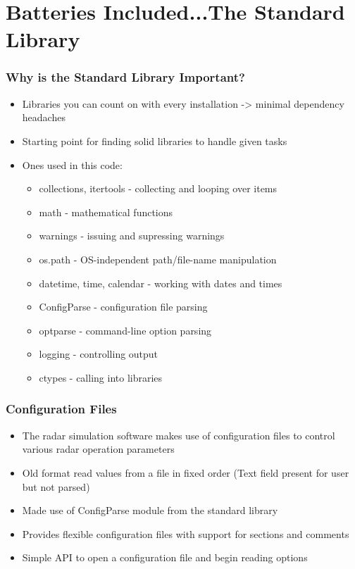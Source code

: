 \documentclass[red, hyperref={pdfpagelabels=false}]{beamer}
\begin{document}
\section[The Standard Library]{Batteries Included...The Standard Library}
\begin{frame}
  \frametitle{Why is the Standard Library Important?}
  \begin{itemize}
    \item<1-> Libraries you can count on with every installation -> minimal dependency headaches
    \item<2-> Starting point for finding solid libraries to handle given tasks
    \item<3-> Ones used in this code:
      \begin{itemize}
        \item collections, itertools - collecting and looping over items
        \item math - mathematical functions
        \item warnings - issuing and supressing warnings
        \item os.path - OS-independent path/file-name manipulation
        \item datetime, time, calendar - working with dates and times
        \item \alert<4->{ConfigParse} - configuration file parsing
        \item \alert<4->{optparse} - command-line option parsing
        \item \alert<4->{logging} - controlling output
        \item \alert<4->{ctypes} - calling into libraries
      \end{itemize}
  \end{itemize}
\end{frame}

\begin{frame}
  \frametitle{Configuration Files}
  \begin{itemize}
    \item The radar simulation software makes use of configuration files to
      control various radar operation parameters
    \item Old format read values from a file in fixed order (Text field present for user but not parsed)
    \item Made use of ConfigParse module from the standard library
    \item Provides flexible configuration files with support for sections and comments
    \item Simple API to open a configuration file and begin reading options
  \end{itemize}
\end{frame}
\end{document}
